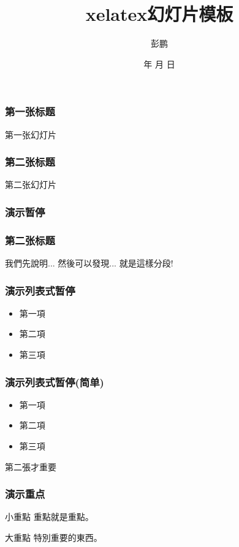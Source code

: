 \documentclass[xcolor=dvipsnames]{beamer}
\renewcommand{\today}{\number\year 年 \number\month 月 \number\day 日}
\begin{document}
\title{xelatex幻灯片模板}
\author{彭鹏}

\date{\today}
\begin{frame}
    \titlepage
\end{frame}

\begin{frame}
    \frametitle{第一张标题}
    第一张幻灯片
\end{frame}

\begin{frame}
    \frametitle{第二张标题}
    第二张幻灯片
\end{frame}

\begin{frame}
    \frametitle{演示暂停}
    \frametitle{第二张标题}
    我們先說明...  
    \pause 
    然後可以發現...  
    \pause 
    就是這樣分段! 
\end{frame}

\begin{frame}
    \frametitle{演示列表式暂停}
    \begin{itemize}
        \item 
            第一項 
            \pause
        \item 
            第二項 
            \pause 
        \item 
            第三項 
    \end{itemize} 
\end{frame}


\begin{frame}
    \frametitle{演示列表式暂停(简单)}
    \begin{itemize}[<+->]
        \item
            第一項
        \item
            第二項
        \item
            第三項
    \end{itemize} 
    \alert<2>{第二張}才重要
\end{frame}

\begin{frame}
    \frametitle{演示重点}
    \begin{block}{小重點} 
        重點就是重點。 
    \end{block}

    \begin{alertblock}{大重點}
        特別重要的東西。 
    \end{alertblock} 
\end{frame}
\end{document}
